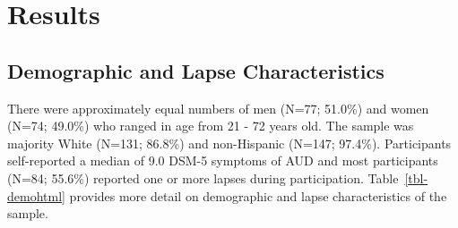 \documentclass[
]{agujournal2019}
\begin{document}
\section{Results}\label{results}

\subsection{Demographic and Lapse
Characteristics}\label{demographic-and-lapse-characteristics}

There were approximately equal numbers of men (N=77; 51.0\%) and women
(N=74; 49.0\%) who ranged in age from 21 - 72 years old. The sample was
majority White (N=131; 86.8\%) and non-Hispanic (N=147; 97.4\%).
Participants self-reported a median of 9.0 DSM-5 symptoms of AUD and
most participants (N=84; 55.6\%) reported one or more lapses during
participation. Table~\ref{tbl-demohtml} provides more detail on
demographic and lapse characteristics of the sample.
\end{document}
